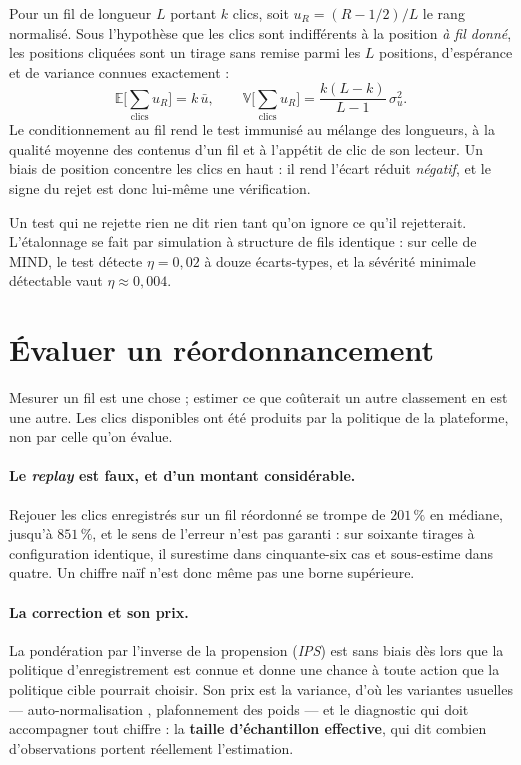 \documentclass[11pt,a4paper]{article}
\begin{document}
Pour un fil de longueur $L$ portant $k$ clics, soit $u_R = (R - 1/2)/L$ le rang normalisé.
Sous l'hypothèse que les clics sont indifférents à la position \emph{à fil donné}, les
positions cliquées sont un tirage sans remise parmi les $L$ positions, d'espérance et de
variance connues exactement :
\begin{equation}
\mathbb{E}\Big[\sum_{\text{clics}} u_R\Big] = k\,\bar{u}, \qquad
\mathbb{V}\Big[\sum_{\text{clics}} u_R\Big] = \frac{k(L-k)}{L-1}\,\sigma^2_u .
\label{eq:echangeabilite}
\end{equation}
Le conditionnement au fil rend le test immunisé au mélange des longueurs, à la qualité
moyenne des contenus d'un fil et à l'appétit de clic de son lecteur. Un biais de position
concentre les clics en haut : il rend l'écart réduit \emph{négatif}, et le signe du rejet est
donc lui-même une vérification.

Un test qui ne rejette rien ne dit rien tant qu'on ignore ce qu'il rejetterait. L'étalonnage
se fait par simulation à structure de fils identique : sur celle de MIND, le test détecte
$\eta = 0{,}02$ à douze écarts-types, et la sévérité minimale détectable vaut
$\eta \approx 0{,}004$.

\section{Évaluer un réordonnancement}
\label{sec:evaluation}

Mesurer un fil est une chose ; estimer ce que coûterait un autre classement en est une autre.
Les clics disponibles ont été produits par la politique de la plateforme, non par celle qu'on
évalue.

\paragraph{Le \emph{replay} est faux, et d'un montant considérable.} Rejouer les clics
enregistrés sur un fil réordonné se trompe de $201\,\%$ en médiane, jusqu'à $851\,\%$, et le
sens de l'erreur n'est pas garanti : sur soixante tirages à configuration identique, il
surestime dans cinquante-six cas et sous-estime dans quatre. Un chiffre naïf n'est donc même
pas une borne supérieure.

\paragraph{La correction et son prix.} La pondération par l'inverse de la propension
(\emph{IPS}) est sans biais dès lors que la politique d'enregistrement est connue et donne
une chance à toute action que la politique cible pourrait choisir. Son prix est la variance,
d'où les variantes usuelles --- auto-normalisation \citep{swaminathan2015}, plafonnement des
poids --- et le diagnostic qui doit accompagner tout chiffre : la \textbf{taille
d'échantillon effective}, qui dit combien d'observations portent réellement l'estimation.
\end{document}
